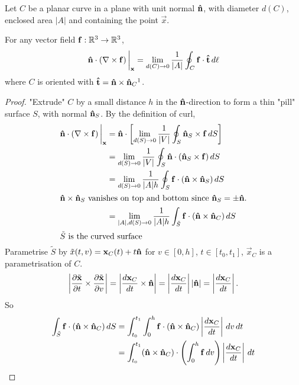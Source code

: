 \documentclass[10pt, a4paper]{article}
\begin{document}
\begin{lemma}
    Let $C$ be a planar curve in a plane with unit normal $\hvec{n}$,
    with diameter $d(C)$,
    enclosed area $|A|$ and containing the point $\vec{x}$.

    For any vector field $\vec{f} : \R ^ 3 \to \R ^ 3$,
    \[
    \hvec{n} \cdot (\bnabla \times \vec{f})\,\biggr|_{\vec{x}} = \lim_{d(C) \to 0}\frac{1}{|A|}\oint_{C}\vec{f}\cdot\hvec{t}\,d\ell
    \]
    where $C$ is oriented with $\hvec{t} = \hvec{n} \times \hvec{n}_{C}\footnotemark$.

    \begin{proof}
        "Extrude"
        $C$ by a small distance $h$ in the $\hvec{n}$-direction to form a thin
        "pill"
        surface $S$,
        with normal $\hvec{n}_{S}$.
        By the definition of curl,
        \begin{align*}
            \hvec{n}\cdot(\bnabla \times \vec{f})\,\biggr|_{\vec{x}} &= \hvec{n}\cdot\left[\lim_{d(S) \to 0}\frac{1}{|V|}\oint_{S}\hvec{n}_{S}\times \vec{f}\,dS\right] \\
            &= \lim_{d(S) \to 0}\frac{1}{|V|}\oint_{S}\hvec{n}\cdot(\hvec{n}_S\times\vec{f})\,dS \\
            &= \lim_{d(S) \to 0}\frac{1}{|A|h}\oint_{S}\vec{f}\cdot(\hvec{n}\times\hvec{n}_{S})\,dS \\
            \intertext{$\hvec{n} \times \hvec{n}_{S}$ vanishes on top and bottom since $\hvec{n}_{S} = \pm \hvec{n}$.}
            &= \lim_{|A|, d(S) \to 0}\frac{1}{|A|h}\int_{\tilde{S}}\vec{f}\cdot(\hvec{n}\times\hvec{n}_{C})\,dS \\
            \intertext{$\tilde{S}$ is the curved surface}
        \end{align*}
        Parametrise $\tilde{S}$ by $\tilde{x}(t, v) = \vec{x}_{C}(t) + t\hvec{n}$ for $v \in [0, h]$,
        $t \in [t_0, t_1]$,
        $\vec{x}_{C}$ is a parametrisation of $C$.
        \[
        \left|\pd[\tilde{\vec{x}}]{t} \times \pd[\tilde{\vec{x}}]{v}\right| = \left|\frac{d\vec{x}_{C}}{dt}\times\hvec{n}\right| = \left|\frac{d\vec{x}_{C}}{dt}\right||\hvec{n}| = \left|\frac{d\vec{x}_{C}}{dt}\right|.
        \]
        So
        \begin{align*}
            \int_{\tilde{S}}\vec{f}\cdot(\hvec{n}\times\hvec{n}_{C})\,dS &= \int_{t_0}^{t_1}\int_{0}^{h}\vec{f}\cdot(\hvec{n}\times\hvec{n}_{C})\left|\frac{d\vec{x}_{C}}{dt}\right|\,dv\,dt \\
            &= \int_{t_0}^{t_1}(\hvec{n}\times\hvec{n}_{C})\cdot\left(\int_{0}^{h}\vec{f}\,dv\right)\left|\frac{d\vec{x}_{C}}{dt}\right|\,dt \\

\end{align*}
\end{proof}
\end{lemma}
\end{document}
